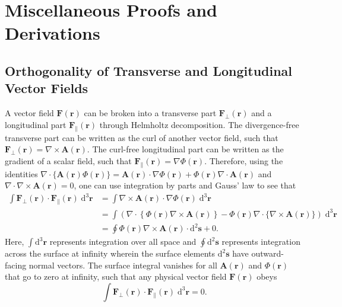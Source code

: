 \documentclass{article}
\begin{document}
\section{Miscellaneous Proofs and Derivations}

\subsection{Orthogonality of Transverse and Longitudinal Vector Fields}\label{sec:helmholtzOrthogonality}

A vector field $\mathbf{F}(\mathbf{r})$ can be broken into a transverse part $\mathbf{F}_\perp(\mathbf{r})$ and a longitudinal part $\mathbf{F}_\parallel(\mathbf{r})$ through Helmholtz decomposition. The divergence-free transverse part can be written as the curl of another vector field, such that $\mathbf{F}_\perp(\mathbf{r}) = \nabla\times\mathbf{A}(\mathbf{r})$. The curl-free longitudinal part can be written as the gradient of a scalar field, such that $\mathbf{F}_\parallel(\mathbf{r}) = \nabla\Phi(\mathbf{r})$. Therefore, using the identities $\nabla\cdot\{\mathbf{A}(\mathbf{r})\Phi(\mathbf{r})\} = \mathbf{A}(\mathbf{r})\cdot\nabla\Phi(\mathbf{r}) + \Phi(\mathbf{r})\nabla\cdot\mathbf{A}(\mathbf{r})$ and $\nabla\cdot\nabla\times\mathbf{A}(\mathbf{r}) = 0$, one can use integration by parts and Gauss' law to see that
\begin{equation}
\begin{split}
\int\mathbf{F}_\perp(\mathbf{r})\cdot\mathbf{F}_\parallel(\mathbf{r})\;\mathrm{d}^3\mathbf{r} &= \int\nabla\times\mathbf{A}(\mathbf{r})\cdot\nabla\Phi(\mathbf{r})\;\mathrm{d}^3\mathbf{r}\\
&=\int\left(\nabla\cdot\left\{\Phi(\mathbf{r})\nabla\times\mathbf{A}(\mathbf{r})\right\} - \Phi(\mathbf{r})\nabla\cdot\{\nabla\times\mathbf{A}(\mathbf{r})\}\right)\;\mathrm{d}^3\mathbf{r}\\
&= \oint\Phi(\mathbf{r})\nabla\times\mathbf{A}(\mathbf{r})\cdot\mathrm{d}^2\mathbf{s} + 0.
\end{split}
\end{equation}
Here, $\int\mathrm{d}^3\mathbf{r}$ represents integration over all space and $\oint\mathrm{d}^2\mathbf{s}$ represents integration across the surface at infinity wherein the surface elements $\mathrm{d}^2\mathbf{s}$ have outward-facing normal vectors. The surface integral vanishes for all $\mathbf{A}(\mathbf{r})$ and $\Phi(\mathbf{r})$ that go to zero at infinity, such that any physical vector field $\mathbf{F}(\mathbf{r})$ obeys
\begin{equation}\label{eq:helmholtzOrthogonality}
\int\mathbf{F}_\perp(\mathbf{r})\cdot\mathbf{F}_\parallel(\mathbf{r})\;\mathrm{d}^3\mathbf{r} = 0.
\end{equation}
\end{document}

